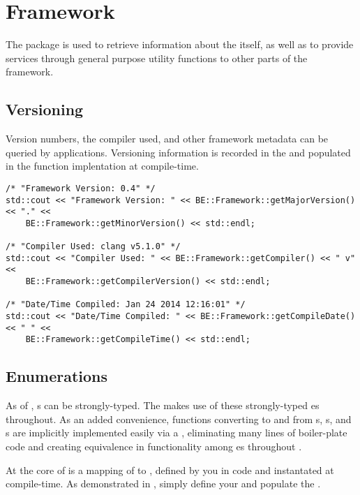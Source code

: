 %
%
\chapter{Framework}
\label{chp-framework}

The  package is used to retrieve information about the
\lname itself, as well as to provide services through general purpose utility
functions to other parts of the framework.

\section{Versioning}
Version numbers, the compiler used, and other framework metadata
can be queried by applications.  Versioning information is recorded in the
\sname {} and populated in the function implentation at
compile-time.

\begin{lstlisting}[caption={Using the \namespace{Framework} API}, label=frameworkuse]
/* "Framework Version: 0.4" */
std::cout << "Framework Version: " << BE::Framework::getMajorVersion() << "." <<
    BE::Framework::getMinorVersion() << std::endl;

/* "Compiler Used: clang v5.1.0" */
std::cout << "Compiler Used: " << BE::Framework::getCompiler() << " v" <<
    BE::Framework::getCompilerVersion() << std::endl;

/* "Date/Time Compiled: Jan 24 2014 12:16:01" */
std::cout << "Date/Time Compiled: " << BE::Framework::getCompileDate() << " " <<
    BE::Framework::getCompileTime() << std::endl;
\end{lstlisting}

\section{Enumerations}
\label{sec_framework-enumerations}

As of \CppXI, s can be strongly-typed. The \lname makes use of
these strongly-typed es throughout. As an added convenience,
functions converting to and from s, s, and s
are implicitly implemented easily via a , eliminating many lines
of boiler-plate code and creating equivalence in functionality among
es throughout \sname.

At the core of  is a  mapping of
 to , defined by you in code and instantated at
compile-time. As demonstrated in , simply define
your  and populate the .

